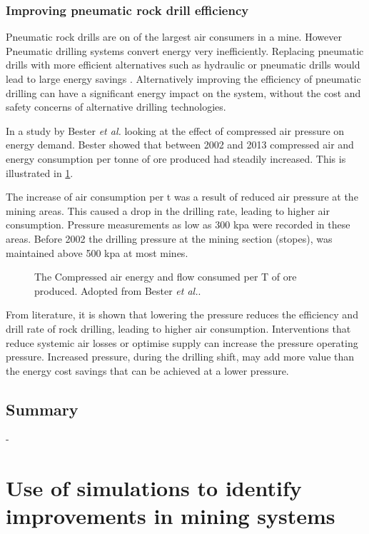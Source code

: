 		\subsubsection{Improving pneumatic rock drill efficiency}
		 Pneumatic rock drills are on of the largest air consumers in a mine. However Pneumatic drilling systems convert energy very inefficiently. Replacing pneumatic drills with more efficient alternatives such as hydraulic or pneumatic drills would lead to large energy savings \cite{Pascoe2016Masters}.  Alternatively improving the efficiency of pneumatic drilling can have a significant energy impact on the system, without the cost and safety concerns of alternative drilling technologies.
		 \par 
		 In a study by  Bester \textit{et al.} \cite{bester2013effect} looking at the effect of compressed air pressure on energy demand. Bester showed that between 2002 and 2013 compressed air and energy consumption per tonne of ore produced had steadily increased. This is illustrated  in \cref{fig: Compressed energy and air flow per ton}. 
		  \par
		 The increase of air consumption per \gls{t} was a result of reduced air pressure at the mining areas. This caused a drop in the drilling rate, leading to higher air consumption. Pressure measurements as low as 300 \gls{kpa} were recorded in these areas. Before 2002 the drilling pressure at the mining section (stopes), was maintained above 500 \gls{kpa} at most mines. 
		 \par 
		 \begin{figure}[h]
		 	\centering
		 	
		 	\caption[The Compressed air energy and flow consumed per T of ore produced.]{The Compressed air energy and flow consumed per T of ore produced. Adopted from Bester \textit{et al.}\cite{bester2013effect}.}
		 	\label{fig: Compressed energy and air flow per ton}
		 \end{figure}
		 From literature, it is shown that lowering the pressure reduces the efficiency and drill rate of rock drilling, leading to higher air consumption. Interventions that reduce systemic air losses or optimise supply can increase the pressure operating pressure. Increased pressure, during the drilling shift, may add more value than the energy cost savings that can be achieved at a lower pressure.
	\subsection{Summary}
	-
\section{Use of simulations to identify improvements in mining systems}
